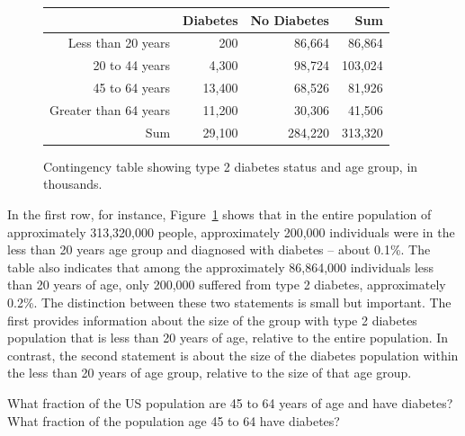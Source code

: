\begin{figure}[ht]
	\centering
	\begin{tabular}{rrrr}
		\hline
		& Diabetes & No Diabetes & Sum \\ 
		\hline
		Less than 20 years & 200 & 86,664 & 86,864 \\ 
		20 to 44 years & 4,300 & 98,724 & 103,024 \\ 
		45 to 64 years & 13,400 & 68,526 & 81,926 \\ 
		Greater than 64 years & 11,200 & 30,306 & 41,506 \\ 
		Sum & 29,100 & 284,220 & 313,320 \\ 
		\hline
	\end{tabular}
	\caption{Contingency table showing type 2 diabetes status and age group, in thousands.}
	\label{DiabetesAgeContTable}
\end{figure}

In the first row, for instance, Figure~\ref{DiabetesAgeContTable} shows that in the entire population of approximately 313,320,000 people, approximately 200,000 individuals were in the less than 20 years age group and diagnosed with diabetes -- about 0.1\%. The table also indicates that among the approximately 86,864,000 individuals less than 20 years of age, only 200,000 suffered from type 2 diabetes, approximately 0.2\%.  The distinction between these two statements is small but important. The first provides information about the size of the group with type 2 diabetes population that is less than 20 years of age, relative to the entire population. In contrast, the second statement is about the size of the diabetes population within the less than 20 years of age group, relative to the size of that age group.

\textD{\newpage}

\begin{exercisewrap}
\begin{nexercise}\label{DiabetesAge20to44}%
What fraction of the US population are 45 to 64 years of age and have diabetes?  What fraction of the population age 45 to 64 have diabetes?\footnotemark{}
\end{nexercise}
\end{exercisewrap}

